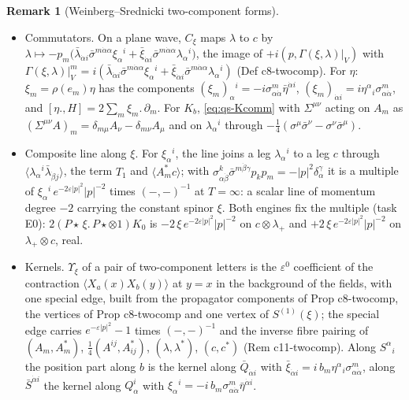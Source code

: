 \documentclass[11pt]{article}
\numberwithin{equation}{section}
\theoremstyle{plain}
\theoremstyle{definition}
\newtheorem{remark}[theorem]{Remark}
\begin{document}
\begin{remark}[Weinberg--Srednicki two-component forms]
\begin{itemize}
\item Commutators. On a plane wave, $C_\xi$ maps $\lambda$ to $c$ by $\lambda\mapsto-p_m\big(\bar\lambda_{\dot\alpha i}\bar\sigma^{m\dot\alpha\alpha}\xi_\alpha{}^i+\bar\xi_{\dot\alpha i}\bar\sigma^{m\dot\alpha\alpha}\lambda_\alpha{}^i\big)$, the image of $+i(p,\Gamma(\xi,\lambda)|_V)$ with $\Gamma(\xi,\lambda)|_V^m=i(\bar\lambda_{\dot\alpha i}\bar\sigma^{m\dot\alpha\alpha}\xi_\alpha{}^i+\bar\xi_{\dot\alpha i}\bar\sigma^{m\dot\alpha\alpha}\lambda_\alpha{}^i)$ (Def c8-twocomp). For $\eta$: $\xi_m=\rho(e_m)\eta$ has the components $(\xi_m)_\alpha{}^i=-i\sigma^m_{\alpha\dot\alpha}\bar\eta^{\dot\alpha i}$, $(\xi_m)_{\dot\alpha i}=i\eta^\alpha{}_i\sigma^m_{\alpha\dot\alpha}$, and $[\eta.,H]=2\sum_m\xi_m.\,\partial_m$. For $K_b$, \eqref{eq:qs-Kcomm} with $\Sigma^{\mu\nu}$ acting on $A_m$ as $(\Sigma^{\mu\nu}A)_m=\delta_{m\mu}A_\nu-\delta_{m\nu}A_\mu$ and on $\lambda_\alpha{}^i$ through $-\tfrac14(\sigma^\mu\bar\sigma^\nu-\sigma^\nu\bar\sigma^\mu)$.
\item Composite line along $\xi$. For $\xi_\alpha{}^i$, the line joins a leg $\lambda_\alpha{}^i$ to a leg $c$ through $\langle\lambda_\alpha{}^i\bar\lambda_{\dot\beta j}\rangle$, the term $T_1$ and $\langle A^*_mc\rangle$; with $\sigma^k_{\alpha\dot\beta}\bar\sigma^{m\dot\beta\gamma}p_kp_m=-|p|^2\delta_\alpha^\gamma$ it is a multiple of $\xi_\alpha{}^i\,e^{-2\varepsilon|p|^2}|p|^{-2}$ times $(-,-)^{-1}$ at $T=\infty$: a scalar line of momentum degree $-2$ carrying the constant spinor $\xi$. Both engines fix the multiple (task E0): $2(P\star\,\xi.\,P\star\otimes1)K_0$ is $-2\,\xi\,e^{-2\varepsilon|p|^2}|p|^{-2}$ on $c\otimes\lambda_+$ and $+2\,\xi\,e^{-2\varepsilon|p|^2}|p|^{-2}$ on $\lambda_+\otimes c$, real.
\item Kernels. $\Upsilon_\xi$ of a pair of two-component letters is the $\varepsilon^0$ coefficient of the contraction $\langle X_a(x)X_b(y)\rangle$ at $y=x$ in the background of the fields, with one special edge, built from the propagator components of Prop c8-twocomp, the vertices of Prop c8-twocomp and one vertex of $S^{(1)}(\xi)$; the special edge carries $e^{-\varepsilon|p|^2}-1$ times $(-,-)^{-1}$ and the inverse fibre pairing of $(A_m,A^*_m)$, $\tfrac14(A^{ij},A^*_{ij})$, $(\lambda,\lambda^*)$, $(c,c^*)$ (Rem c11-twocomp). Along $S^\alpha{}_i$ the position part along $b$ is the kernel along $\bar Q_{\dot\alpha i}$ with $\bar\xi_{\dot\alpha i}=i\,b_m\eta^\alpha{}_i\sigma^m_{\alpha\dot\alpha}$, along $\bar S^{\dot\alpha i}$ the kernel along $Q^i_\alpha$ with $\xi_\alpha{}^i=-i\,b_m\sigma^m_{\alpha\dot\alpha}\bar\eta^{\dot\alpha i}$.

\end{itemize}
\end{remark}
\end{document}
